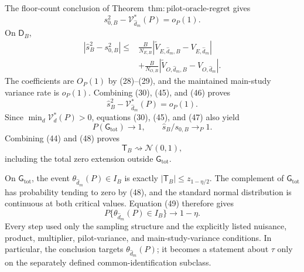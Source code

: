 The floor-count conclusion of Theorem~\(\mathrm{thm{:}pilot\text{-}oracle\text{-}regret}\) gives
\[
 s_{0,B}^2-\mathcal V_{\widehat d_m}^*(P)=o_P(1).             \tag{45}
\]
On \(\mathsf D_B\),
\[
\begin{aligned}
 |\widehat s_B^2-s_{0,B}^2|
 \le{}&\frac{B}{N_{E,B}}
 |\widetilde V_{E,\widehat d_m,B}-V_{E,\widehat d_m}|\\
 &+\frac{B}{N_{O,B}}
 |\widetilde V_{O,\widehat d_m,B}-V_{O,\widehat d_m}|.      \tag{46}
\end{aligned}
\]
The coefficients are \(O_P(1)\) by (28)--(29), and the maintained main-study variance rate is \(o_P(1)\).  Combining (30), (45), and (46) proves
\[
 \widehat s_B^2-\mathcal V_{\widehat d_m}^*(P)=o_P(1).        \tag{47}
\]
Since \(\min_d\mathcal V_d^*(P)>0\), equations (30), (45), and (47) also yield
\[
 P(\mathsf G_{\mathrm{tot}})\longrightarrow1,
 \qquad \widehat s_B/s_{0,B}\longrightarrow_P1.             \tag{48}
\]
Combining (44) and (48) proves
\[
 \mathsf T_B\rightsquigarrow\mathcal N(0,1),                \tag{49}
\]
including the total zero extension outside \(\mathsf G_{\mathrm{tot}}\).

On \(\mathsf G_{\mathrm{tot}}\), the event \(\theta_{\widehat d_m}(P)\in I_B\) is exactly \(|\mathsf T_B|\le z_{1-\eta/2}\).  The complement of \(\mathsf G_{\mathrm{tot}}\) has probability tending to zero by (48), and the standard normal distribution is continuous at both critical values.  Equation (49) therefore gives
\[
 P\{\theta_{\widehat d_m}(P)\in I_B\}\longrightarrow1-\eta.
\]
Every step used only the sampling structure and the explicitly listed nuisance, product, multiplier, pilot-variance, and main-study-variance conditions.  In particular, the conclusion targets \(\theta_{\widehat d_m}(P)\); it becomes a statement about \(\tau\) only on the separately defined common-identification subclass.